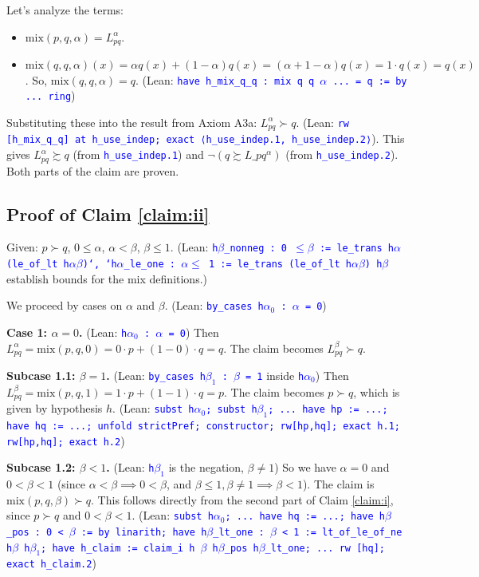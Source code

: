 \documentclass{article}
\theoremstyle{definition}
\newcommand{\tactic}[1]{\textcolor{blue}{\texttt{#1}}}
\newcommand{\pref}{\succsim} %
\newcommand{\strictpref}{\succ} %
\newcommand{\mix}{\mathrm{mix}} %
\begin{document}
Let's analyze the terms:
\begin{itemize}
    \item $\mix(p, q, \alpha) = L_{pq}^\alpha$.
    \item $\mix(q, q, \alpha)(x) = \alpha q(x) + (1-\alpha) q(x) = (\alpha+1-\alpha)q(x) = 1 \cdot q(x) = q(x)$. So, $\mix(q, q, \alpha) = q$.
    (Lean: \tactic{have h\_mix\_q\_q : mix q q $\alpha$ ... = q := by ... ring})
\end{itemize}
Substituting these into the result from Axiom A3a:
$L_{pq}^\alpha \strictpref q$.
(Lean: \tactic{rw [h\_mix\_q\_q] at h\_use\_indep; exact ⟨h\_use\_indep.1, h\_use\_indep.2⟩}).
This gives $L_{pq}^\alpha \pref q$ (from \tactic{h\_use\_indep.1}) and $\lnot(q \pref L\_{pq}^\alpha)$ (from \tactic{h\_use\_indep.2}).
Both parts of the claim are proven.

\subsection{Proof of Claim \ref{claim:ii}}\label{proof:claim:ii}
Given: $p \strictpref q$, $0 \le \alpha$, $\alpha < \beta$, $\beta \le 1$.
(Lean: \tactic{h$\beta$\_nonneg : 0 $\leq\beta$ := le\_trans h$\alpha$ (le\_of\_lt h$\alpha\beta$)`, `h$\alpha$\_le\_one : $\alpha\leq$ 1 := le\_trans (le\_of\_lt h$\alpha\beta$) h$\beta$} establish bounds for the mix definitions.)

We proceed by cases on $\alpha$ and $\beta$.
(Lean: \tactic{by\_cases h$\alpha_0$ : $\alpha$ = 0})

\textbf{Case 1: $\alpha = 0$.} (Lean: \tactic{h$\alpha_0$ : $\alpha$ = 0})
Then $L_{pq}^\alpha = \mix(p, q, 0) = 0 \cdot p + (1-0) \cdot q = q$.
The claim becomes $L_{pq}^\beta \strictpref q$.

    \textbf{Subcase 1.1: $\beta = 1$.} (Lean: \tactic{by\_cases h$\beta_1$ : $\beta$ = 1} inside \tactic{h$\alpha_0$})
    Then $L_{pq}^\beta = \mix(p, q, 1) = 1 \cdot p + (1-1) \cdot q = p$.
    The claim becomes $p \strictpref q$, which is given by hypothesis $h$.
    (Lean: \tactic{subst h$\alpha_0$; subst h$\beta_1$; ... have hp := ...; have hq := ...; unfold strictPref; constructor; rw[hp,hq]; exact h.1; rw[hp,hq]; exact h.2})

    \textbf{Subcase 1.2: $\beta < 1$.} (Lean: \tactic{h$\beta_1$} is the negation, $\beta \ne 1$)
    So we have $\alpha=0$ and $0 < \beta < 1$ (since $\alpha < \beta \implies 0 < \beta$, and $\beta \le 1, \beta \ne 1 \implies \beta < 1$).
    The claim is $\mix(p, q, \beta) \strictpref q$.
    This follows directly from the second part of Claim \ref{claim:i}, since $p \strictpref q$ and $0 < \beta < 1$.
    (Lean: \tactic{subst h$\alpha_0$; ... have hq := ...; have h$\beta$\_pos : 0 < $\beta$ := by linarith; have h$\beta$\_lt\_one : $\beta$ < 1 := lt\_of\_le\_of\_ne h$\beta$ h$\beta_1$; have h\_claim := claim\_i h $\beta$ h$\beta$\_pos h$\beta$\_lt\_one; ... rw [hq]; exact h\_claim.2})
\end{document}
